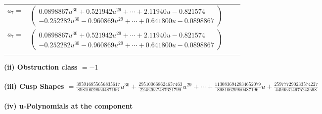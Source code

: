 \documentclass[1p]{elsarticle_modified}
\theoremstyle{definition}
\begin{document}
\begin{tabular}{m{7pt} m{180pt} m{7pt} m{180pt} }
\flushright $a_{7}=$&$\begin{pmatrix}0.0898867 u^{30}+0.521942 u^{29}+\cdots+2.11940 u-0.821574\\-0.252282 u^{30}-0.960869 u^{29}+\cdots+0.641800 u-0.0898867\end{pmatrix}$\\ \flushright $a_{7}=$&$\begin{pmatrix}0.0898867 u^{30}+0.521942 u^{29}+\cdots+2.11940 u-0.821574\\-0.252282 u^{30}-0.960869 u^{29}+\cdots+0.641800 u-0.0898867\end{pmatrix}$\\&\end{tabular}
\flushleft \textbf{(ii) Obstruction class $= -1$}\\~\\
\flushleft \textbf{(iii) Cusp Shapes $= \frac{395916855656835617}{89810629950487196} u^{30}+\frac{295100668624657463}{22452657487621799} u^{29}+\cdots+\frac{1130836942834652079}{89810629950487196} u+\frac{259777290233574227}{44905314975243598}$}\\~\\
\newpage\renewcommand{\arraystretch}{1}
\flushleft \textbf{(iv) u-Polynomials at the component}\newline \\
\end{document}
